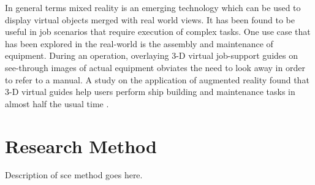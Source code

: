 In general terms mixed reality is an emerging technology which can be used to display virtual objects merged with real world views. It has been found to be useful in job scenarios that require execution of complex tasks. One use case that has been explored in the real-world is the assembly and maintenance of equipment. During an operation, overlaying 3-D virtual job-support guides on see-through images of actual equipment obviates the need to look away in order to refer to a manual. A study on the application of augmented reality found that 3-D virtual guides help users perform ship building and maintenance tasks in almost half the usual time \parencite{henderson2011exploring}.



\section{Research Method}
Description of sce method goes here.